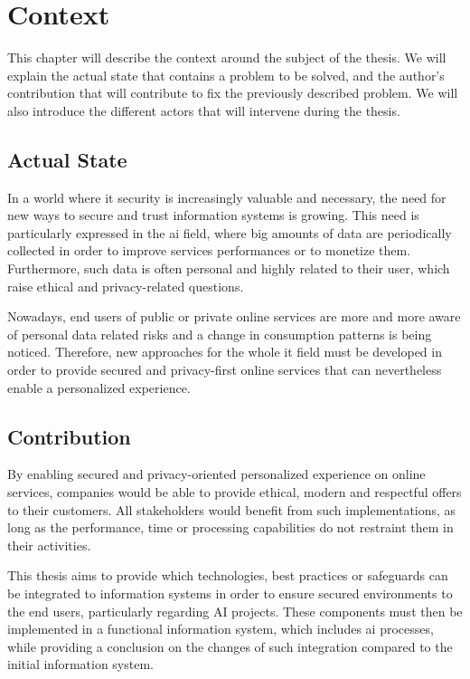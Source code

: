 \chapter{Context}
\label{chap:context}

This chapter will describe the context around the subject of the thesis. We will explain the actual state that contains a problem to be solved, and the author's contribution that will contribute to fix the previously described problem. We will also introduce the different actors that will intervene during the thesis.

\section{Actual State}
\label{sec:context_actual}

In a world where \gls{it} security is increasingly valuable and necessary, the need for new ways to secure and trust information systems is growing. This need is particularly expressed in the \gls{ai} field, where big amounts of data are periodically collected in order to improve services performances or to monetize them. Furthermore, such data is often personal and highly related to their user, which raise ethical and privacy-related questions.

Nowadays, end users of public or private online services are more and more aware of personal data related risks and a change in consumption patterns is being noticed. Therefore, new approaches for the whole \gls{it} field must be developed in order to provide secured and privacy-first online services that can nevertheless enable a personalized experience.

\section{Contribution}
\label{sec:context_contribution}

By enabling secured and privacy-oriented personalized experience on online services, companies would be able to provide ethical, modern and respectful offers to their customers. All stakeholders would benefit from such implementations, as long as the performance, time or processing capabilities do not restraint them in their activities.

This thesis aims to provide which technologies, best practices or safeguards can be integrated to information systems in order to ensure secured environments to the end users, particularly regarding AI projects. These components must then be implemented in a functional information system, which includes \gls{ai} processes, while providing a conclusion on the changes of such integration compared to the initial information system.

